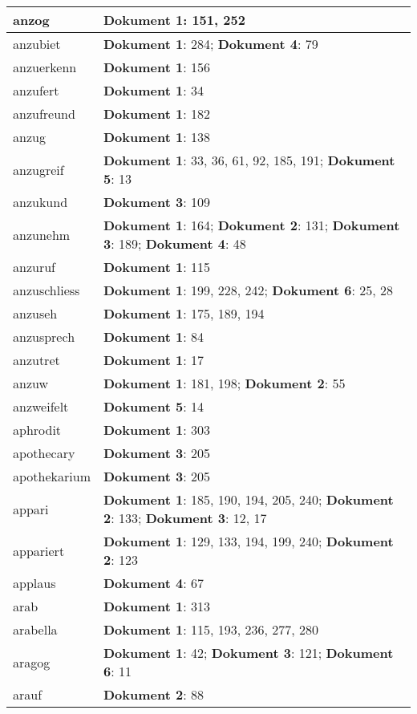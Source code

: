 \documentclass[a5paper]{article}
\begin{document}
\begin{longtable}[l]{|l|p{3in}|}
\hline
anzog & \textbf{Dokument 1}: 151, 252 \\
\hline
anzubiet & \textbf{Dokument 1}: 284; \textbf{Dokument 4}: 79 \\
\hline
anzuerkenn & \textbf{Dokument 1}: 156 \\
\hline
anzufert & \textbf{Dokument 1}: 34 \\
\hline
anzufreund & \textbf{Dokument 1}: 182 \\
\hline
anzug & \textbf{Dokument 1}: 138 \\
\hline
anzugreif & \textbf{Dokument 1}: 33, 36, 61, 92, 185, 191; \textbf{Dokument 5}: 13 \\
\hline
anzukund & \textbf{Dokument 3}: 109 \\
\hline
anzunehm & \textbf{Dokument 1}: 164; \textbf{Dokument 2}: 131; \textbf{Dokument 3}: 189; \textbf{Dokument 4}: 48 \\
\hline
anzuruf & \textbf{Dokument 1}: 115 \\
\hline
anzuschliess & \textbf{Dokument 1}: 199, 228, 242; \textbf{Dokument 6}: 25, 28 \\
\hline
anzuseh & \textbf{Dokument 1}: 175, 189, 194 \\
\hline
anzusprech & \textbf{Dokument 1}: 84 \\
\hline
anzutret & \textbf{Dokument 1}: 17 \\
\hline
anzuw & \textbf{Dokument 1}: 181, 198; \textbf{Dokument 2}: 55 \\
\hline
anzweifelt & \textbf{Dokument 5}: 14 \\
\hline
aphrodit & \textbf{Dokument 1}: 303 \\
\hline
apothecary & \textbf{Dokument 3}: 205 \\
\hline
apothekarium & \textbf{Dokument 3}: 205 \\
\hline
appari & \textbf{Dokument 1}: 185, 190, 194, 205, 240; \textbf{Dokument 2}: 133; \textbf{Dokument 3}: 12, 17 \\
\hline
appariert & \textbf{Dokument 1}: 129, 133, 194, 199, 240; \textbf{Dokument 2}: 123 \\
\hline
applaus & \textbf{Dokument 4}: 67 \\
\hline
arab & \textbf{Dokument 1}: 313 \\
\hline
arabella & \textbf{Dokument 1}: 115, 193, 236, 277, 280 \\
\hline
aragog & \textbf{Dokument 1}: 42; \textbf{Dokument 3}: 121; \textbf{Dokument 6}: 11 \\
\hline
arauf & \textbf{Dokument 2}: 88 \\

\end{longtable}
\end{document}
